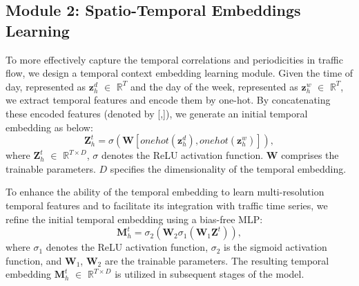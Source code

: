 
\subsection{Module 2: Spatio-Temporal Embeddings Learning}
To more effectively capture the temporal correlations and periodicities in traffic flow, we design a temporal context embedding learning module. Given the time of day, represented as $\mathbf{z}^{d}_{h}$ $\in$ $\mathbb{R}^{T}$ and the day of the week, represented as $\mathbf{z}^{w}_{h}$ $\in$ $\mathbb{R}^{T}$, we extract temporal features and encode them by one-hot. By concatenating these encoded features (denoted by [,]), we generate an initial temporal embedding as below:
\begin{equation}
    \mathbf{Z}^{t}_{h}=\sigma(\mathbf{W}[onehot(\mathbf{z}^{d}_{h}), onehot(\mathbf{z}^{w}_{h})]),
    \label{eq:SEmbedding_1}
\end{equation}
where $\mathbf{Z}^{t}_{h}$ $\in$ $\mathbb{R}^{T\times D}$, $\sigma$ denotes the ReLU activation function. $\mathbf{W}$ comprises the trainable parameters. $\textit{D}$ specifies the dimensionality of the temporal embedding.

To enhance the ability of the temporal embedding to learn multi-resolution temporal features and to facilitate its integration with traffic time series, we refine the initial temporal embedding using a bias-free MLP:
\begin{equation}
    \mathbf{M}^{t}_{h}=\sigma_{2}(\mathbf{W}_{2}\sigma_{1}(\mathbf{W}_{1}\mathbf{Z}^{t})),
    \label{eq:SEmbedding_2}
\end{equation}
where $\sigma_{1}$ denotes the ReLU activation function, $\sigma_{2}$ is the sigmoid activation function, and $\mathbf{W}_{1}$, $\mathbf{W}_{2}$ are the trainable parameters. The resulting temporal embedding $\mathbf{M}^{t}_{h}$ $\in$ $\mathbb{R}^{T\times D}$ is utilized in subsequent stages of the model.

